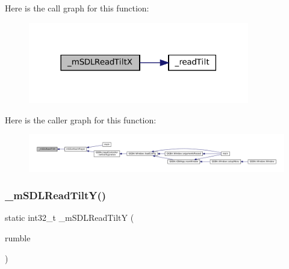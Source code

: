 Here is the call graph for this function\+:
\nopagebreak
\begin{figure}[H]
\begin{center}
\leavevmode
\includegraphics[width=273pt]{sdl-events_8c_a59d9838f0971eeb48f431096dc09f0a1_cgraph}
\end{center}
\end{figure}
Here is the caller graph for this function\+:
\nopagebreak
\begin{figure}[H]
\begin{center}
\leavevmode
\includegraphics[width=350pt]{sdl-events_8c_a59d9838f0971eeb48f431096dc09f0a1_icgraph}
\end{center}
\end{figure}
\mbox{\label{sdl-events_8c_a3fac3449468e84b4d3667c7b9468a1c7}} 
\subsubsection{\texorpdfstring{\+\_\+m\+S\+D\+L\+Read\+Tilt\+Y()}{\_mSDLReadTiltY()}}
{\footnotesize\ttfamily static int32\+\_\+t \+\_\+m\+S\+D\+L\+Read\+TiltY (\begin{DoxyParamCaption}\item[{struct m\+Rotation\+Source $\ast$}]{rumble }\end{DoxyParamCaption})\hspace{0.3cm}{\ttfamily [static]}}

